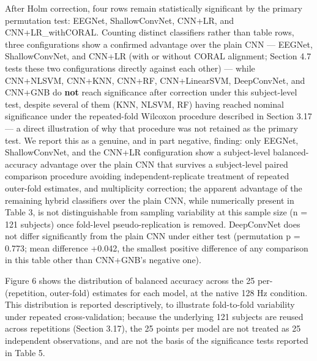 \documentclass[a4paper,fleqn]{cas-sc}
\begin{document}
After Holm correction, four rows remain statistically significant by the primary permutation test: EEGNet, ShallowConvNet, CNN+LR, and CNN+LR\_withCORAL. Counting distinct classifiers rather than table rows, three configurations show a confirmed advantage over the plain CNN --- EEGNet, ShallowConvNet, and CNN+LR (with or without CORAL alignment; Section 4.7 tests these two configurations directly against each other) --- while CNN+NLSVM, CNN+KNN, CNN+RF, CNN+LinearSVM, DeepConvNet, and CNN+GNB do \textbf{not} reach significance after correction under this subject-level test, despite several of them (KNN, NLSVM, RF) having reached nominal significance under the repeated-fold Wilcoxon procedure described in Section 3.17 --- a direct illustration of why that procedure was not retained as the primary test. We report this as a genuine, and in part negative, finding: only EEGNet, ShallowConvNet, and the CNN+LR configuration show a subject-level balanced-accuracy advantage over the plain CNN that survives a subject-level paired comparison procedure avoiding independent-replicate treatment of repeated outer-fold estimates, and multiplicity correction; the apparent advantage of the remaining hybrid classifiers over the plain CNN, while numerically present in Table 3, is not distinguishable from sampling variability at this sample size (n = 121 subjects) once fold-level pseudo-replication is removed. DeepConvNet does not differ significantly from the plain CNN under either test (permutation p = 0.773; mean difference +0.042, the smallest positive difference of any comparison in this table other than CNN+GNB's negative one).



Figure 6 shows the distribution of balanced accuracy across the 25 per-(repetition, outer-fold) estimates for each model, at the native 128 Hz condition. This distribution is reported descriptively, to illustrate fold-to-fold variability under repeated cross-validation; because the underlying 121 subjects are reused across repetitions (Section 3.17), the 25 points per model are not treated as 25 independent observations, and are not the basis of the significance tests reported in Table 5.
\end{document}
